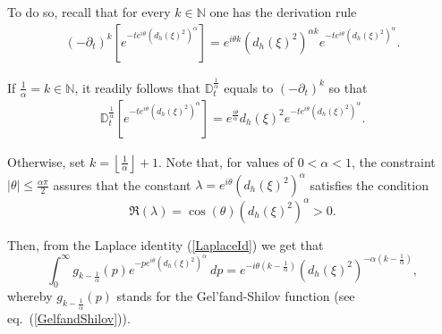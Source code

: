 \documentclass{elsarticle}
\newcommand{\BN}{{\mathbb N}}
\begin{document}
To do so, recall that for every $k\in \mathbb{N}$ one has the derivation rule
\begin{eqnarray}
	\label{dkExp}\left(-\partial_t\right)^{k}\left[e^{-te^{i\theta}\left(d_h(\xi)^2\right)^\alpha}\right]=e^{i \theta  k}\left(d_h(\xi)^2\right)^{\alpha k}e^{-te^{i\theta}\left(d_h(\xi)^2\right)^\alpha}. 
\end{eqnarray}


If $\frac{1}{\alpha}=k\in \BN$, it readily follows that $\mathbb{D}_t^{\frac{1}{\alpha}}$ equals to $(-\partial_t)^k$ so that 
\begin{eqnarray*}
	\mathbb{D}_t^{\frac{1}{\alpha}}\left[e^{-te^{i\theta}\left(d_h(\xi)^2\right)^\alpha} \right]=e^{\frac{i\theta}{\alpha}}
	d_h(\xi)^2e^{-te^{i\theta}\left(d_h(\xi)^2\right)^\alpha}.
\end{eqnarray*}

Otherwise, set $k=\left\lfloor \frac{1}{\alpha} \right\rfloor+1$. Note that, for values of $0<\alpha<1$, the constraint $|\theta|\leq \frac{\alpha \pi}{2}$ assures that the constant $\lambda=e^{i\theta}\left(d_h(\xi)^2\right)^\alpha$ satisfies the condition
$$
\Re(\lambda)=\cos(\theta)\left(d_h(\xi)^2\right)^\alpha>0.
$$

Then, from the Laplace identity (\ref{LaplaceId}) we get that 
$$
\int_0^\infty g_{k-\frac{1}{\alpha}}(p)e^{-pe^{i\theta}\left(d_h(\xi)^2\right)^\alpha}~dp=e^{-i \theta\left(k-\frac{1}{\alpha}\right)}\left(d_h(\xi)^2\right)^{-\alpha\left(k-\frac{1}{\alpha}\right)},
$$
whereby $g_{k-\frac{1}{\alpha}}(p)$ stands for the Gel'fand-Shilov function (see eq.~(\ref{GelfandShilov})).
\end{document}
